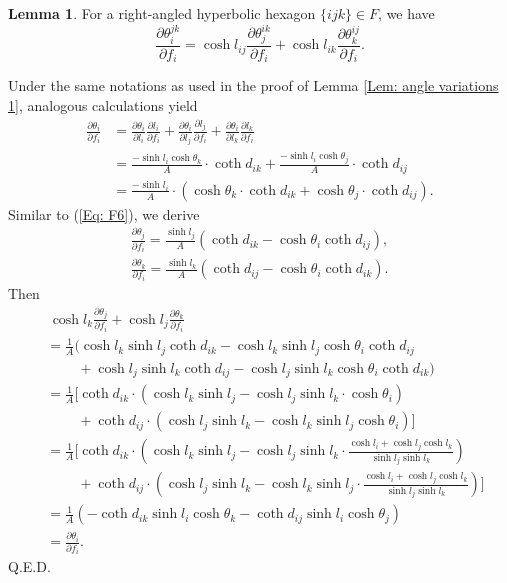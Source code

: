 \documentclass[12pt]{amsart}
\theoremstyle{definition}
\newtheorem{lemma}[theorem]{Lemma}
\def\qed{\hfill{Q.E.D.}\smallskip}
\begin{document}
\begin{lemma}\label{Lem: angle variations 2}
For a right-angled hyperbolic  hexagon $\{ijk\}\in F$, we have
\begin{equation}\label{Eq: angle 2}
\frac{\partial \theta^{jk}_i}{\partial f_i}
=\cosh l_{ij}\frac{\partial \theta^{ik}_j}{\partial f_i}
+\cosh l_{ik}\frac{\partial \theta^{ij}_k}{\partial f_i}.
\end{equation}
\end{lemma}
\proof
Under the same notations as used in the proof of Lemma \ref{Lem: angle variations 1}, analogous calculations yield
\begin{equation*}
\begin{aligned}
\frac{\partial \theta_i}{\partial f_i}
&=\frac{\partial \theta_i}{\partial l_i}\frac{\partial l_i}{\partial f_i}
+\frac{\partial \theta_i}{\partial l_j}\frac{\partial l_j}{\partial f_i}
+\frac{\partial \theta_i}{\partial l_k}\frac{\partial l_k}{\partial f_i}\\
&=\frac{-\sinh l_i\cosh \theta_k}{A}\cdot\coth d_{ik}
+\frac{-\sinh l_i\cosh \theta_j}{A}\cdot\coth d_{ij}\\
&=\frac{-\sinh l_i}{A}\cdot\left(\cosh \theta_k\cdot\coth d_{ik}+\cosh \theta_j\cdot\coth d_{ij}\right).
\end{aligned}
\end{equation*}
Similar to (\ref{Eq: F6}), we derive
\begin{gather*}
\frac{\partial \theta_j}{\partial f_i}
=\frac{\sinh l_j}{A}(\coth d_{ik}-\cosh \theta_i\coth d_{ij}), \\
\frac{\partial \theta_k}{\partial f_i}
=\frac{\sinh l_k}{A}(\coth d_{ij}-\cosh \theta_i\coth d_{ik}).
\end{gather*}
Then
\begin{equation*}
\begin{aligned}
&\, \cosh l_k\frac{\partial \theta_j}{\partial f_i}+\cosh l_j\frac{\partial \theta_k}{\partial f_i}\\
&=\frac{1}{A}(\cosh l_k\sinh l_j\coth d_{ik}
-\cosh l_k\sinh l_j\cosh \theta_i\coth d_{ij}\\
&\ \ \ \ \ \ \ \ \ \ +\cosh l_j\sinh l_k\coth d_{ij}
-\cosh l_j\sinh l_k\cosh \theta_i\coth d_{ik})\\
&=\frac{1}{A}[\coth d_{ik}\cdot(\cosh l_k\sinh l_j-\cosh l_j\sinh l_k\cdot\cosh \theta_i)\\
&\ \ \ \ \ \ \ \ \ \ +\coth d_{ij}\cdot(\cosh l_j\sinh l_k-\cosh l_k\sinh l_j\cosh \theta_i)]\\
&=\frac{1}{A}[\coth d_{ik}\cdot(\cosh l_k\sinh l_j-\cosh l_j\sinh l_k\cdot\frac{\cosh l_i+\cosh l_j\cosh l_k}{\sinh l_j\sinh l_k})\\
&\ \ \ \ \ \ \ \ \  \ +\coth d_{ij}\cdot(\cosh l_j\sinh l_k-\cosh l_k\sinh l_j\cdot\frac{\cosh l_i+\cosh l_j\cosh l_k}{\sinh l_j\sinh l_k})]\\
&=\frac{1}{A}(-\coth d_{ik}\sinh l_i\cosh \theta_k
-\coth d_{ij}\sinh l_i\cosh \theta_j)\\
&=\frac{\partial \theta_i}{\partial f_i}.
\end{aligned}
\end{equation*}
\qed
\end{document}
